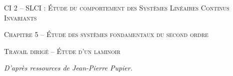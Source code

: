 \documentclass[11pt,oneside]{article}
\begin{document}
\pagestyle{fancy}
\renewcommand{\headrulewidth}{0pt}

\fancyhead{}

\fancyhead[C]{\rule{12cm}{.5pt}}


\renewcommand{\footrulewidth}{0.2pt}

\fancyfoot[C]{\footnotesize{\bfseries \thepage}}





\begin{center}
 \Large\textsc{CI 2 -- SLCI : Étude du comportement des Systèmes Linéaires Continus Invariants}
\end{center}

\begin{center}
 \large\textsc{Chapitre 5 -- Étude des systèmes fondamentaux du second ordre}
\end{center}

\begin{center}
\textsc{Travail dirigé -- Étude d'un laminoir} 
\end{center}

\begin{flushright}
\textit{D'après ressources de Jean-Pierre Pupier.} 
\end{flushright}
\end{document}

